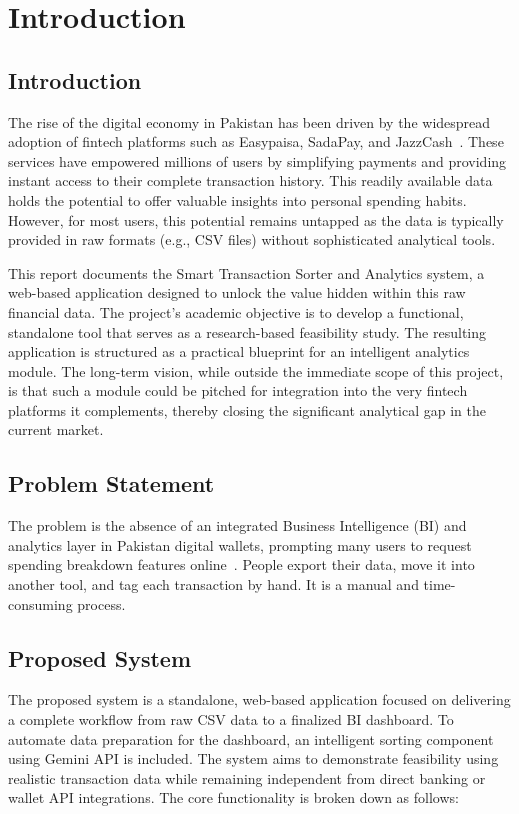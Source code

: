 
\chapter{Introduction}

\section{Introduction}
The rise of the digital economy in Pakistan has been driven by the widespread adoption of fintech platforms such as Easypaisa, SadaPay, and JazzCash~\cite{baig2022future}. These services have empowered millions of users by simplifying payments and providing instant access to their complete transaction history. This readily available data holds the potential to offer valuable insights into personal spending habits. However, for most users, this potential remains untapped as the data is typically provided in raw formats (e.g., CSV files) without sophisticated analytical tools.

This report documents the Smart Transaction Sorter and Analytics system, a web-based application designed to unlock the value hidden within this raw financial data. The project's academic objective is to develop a functional, standalone tool that serves as a research-based feasibility study. The resulting application is structured as a practical blueprint for an intelligent analytics module. The long-term vision, while outside the immediate scope of this project, is that such a module could be pitched for integration into the very fintech platforms it complements, thereby closing the significant analytical gap in the current market.

\section{Problem Statement}
The problem is the absence of an integrated Business Intelligence (BI) and analytics layer in Pakistan digital wallets, prompting many users to request spending breakdown features online~\cite{reddit2023sadapay}. People export their data, move it into another tool, and tag each transaction by hand. It is a manual and time-consuming process.

\section{Proposed System}
The proposed system is a standalone, web-based application focused on delivering a complete workflow from raw CSV data to a finalized BI dashboard. To automate data preparation for the dashboard, an intelligent sorting component using Gemini API is included. The system aims to demonstrate feasibility using realistic transaction data while remaining independent from direct banking or wallet API integrations. The core functionality is broken down as follows:

